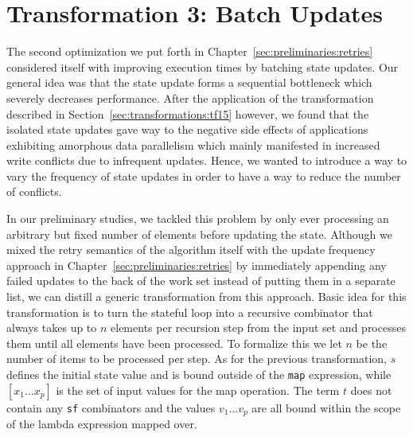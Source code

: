 \section{Transformation 3: Batch Updates}%
\label{sec:transformations:tf2}

The second optimization we put forth in Chapter~\ref{sec:preliminaries:retries} considered itself with improving execution times by batching state updates.
Our general idea was that the state update forms a sequential bottleneck which severely decreases performance.
After the application of the transformation described in Section~\ref{sec:transformations:tf15} however, we found that the isolated state updates gave way to the negative side effects of applications exhibiting amorphous data parallelism which mainly manifested in increased write conflicts due to infrequent updates.
Hence, we wanted to introduce a way to vary the frequency of state updates in order to have a way to reduce the number of conflicts.

In our preliminary studies, we tackled this problem by only ever processing an arbitrary but fixed number of elements before updating the state.
Although we mixed the retry semantics of the algorithm itself with the update frequency approach in Chapter~\ref{sec:preliminaries:retries} by immediately appending any failed updates to the back of the work set instead of putting them in a separate list, we can distill a generic transformation from this approach.
Basic idea for this transformation is to turn the stateful loop into a recursive combinator that always takes up to $n$ elements per recursion step from the input set and processes them until all elements have been processed.
To formalize this we let $n$ be the number of items to be processed per step.
As for the previous transformation, $s$ defines the initial state value and is bound outside of the \texttt{map} expression, while $[x_1 \dots x_p]$ is the set of input values for the map operation.
The term $t$ does not contain any \texttt{sf} combinators and the values $v_1 \dots v_p$ are all bound within the scope of the lambda expression mapped over.

\newpage

